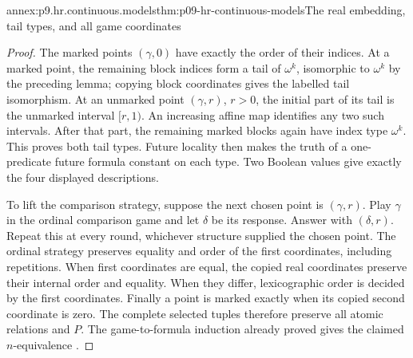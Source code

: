 \begin{annexitem}{annex:p9.hr.continuous.models}{thm:p09-hr-continuous-models}{The real embedding, tail types, and all game coordinates}
\begin{proof}
The marked points
\((\gamma,0)\) have
exactly the order
of their indices.
At a marked point,
the remaining block
indices form a tail
of \(\omega^k\),
isomorphic to
\(\omega^k\) by
the preceding lemma;
copying block coordinates
gives the labelled
tail isomorphism.
At an unmarked point
\((\gamma,r)\), \(r>0\),
the initial part of
its tail is the
unmarked interval
\([r,1)\).
An increasing affine
map identifies any
two such intervals.
After that part,
the remaining marked
blocks again have
index type \(\omega^k\).
This proves both
tail types. Future
locality then makes
the truth of a
one-predicate future
formula constant on
each type. Two
Boolean values give
exactly the four
displayed descriptions.

To lift the comparison
strategy, suppose the
next chosen point is
\((\gamma,r)\).
Play \(\gamma\) in
the ordinal comparison
game and let \(\delta\)
be its response.
Answer with \((\delta,r)\).
Repeat this at every
round, whichever
structure supplied
the chosen point.
The ordinal strategy
preserves equality
and order of the
first coordinates,
including repetitions.
When first coordinates
are equal, the
copied real coordinates
preserve their internal
order and equality.
When they differ,
lexicographic order
is decided by the
first coordinates.
Finally a point
is marked exactly
when its copied
second coordinate
is zero. The
complete selected
tuples therefore
preserve all atomic
relations and \(P\).
The game-to-formula
induction already
proved gives the
claimed \(n\)-equivalence
\cite[Lemmas~4.2--4.3 and appendix~A]{HirshfeldRabinovich2003Future}.
\end{proof}
\end{annexitem}

